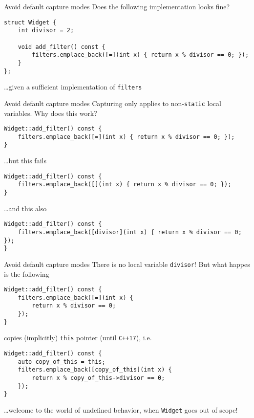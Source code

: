 \begin{frame}[fragile]{Avoid default capture modes}
    Does the following implementation looks fine?
    \begin{lstlisting}
struct Widget {
    int divisor = 2;

    void add_filter() const {
        filters.emplace_back([=](int x) { return x % divisor == 0; });
    }
};
    \end{lstlisting}
    \hfill \ldots given a sufficient implementation of \texttt{filters}

\end{frame}

\begin{frame}[fragile]{Avoid default capture modes}
    Capturing only applies to non-\texttt{static} local variables. Why does this work?
    \begin{lstlisting}
Widget::add_filter() const {
    filters.emplace_back([=](int x) { return x % divisor == 0; });
}
    \end{lstlisting}
    \ldots but this fails
    \begin{lstlisting}
Widget::add_filter() const {
    filters.emplace_back([](int x) { return x % divisor == 0; });
}
    \end{lstlisting}

    \ldots and this also
    \begin{lstlisting}
Widget::add_filter() const {
    filters.emplace_back([divisor](int x) { return x % divisor == 0; });
}
    \end{lstlisting}
\end{frame}

\begin{frame}[fragile]{Avoid default capture modes}
    There is no local variable \texttt{divisor}! But what happes is the following
    \begin{lstlisting}
Widget::add_filter() const {
    filters.emplace_back([=](int x) {
        return x % divisor == 0;
    });
}
    \end{lstlisting}
    copies (implicitly) \texttt{this} pointer (\textcolor{vertexDarkRed}{until \texttt{C++17}}), i.e.
    \begin{lstlisting}    
Widget::add_filter() const {
    auto copy_of_this = this;
    filters.emplace_back([copy_of_this](int x) {
        return x % copy_of_this->divisor == 0;
    });
}
    \end{lstlisting}

    \ldots welcome to the world of undefined behavior, when \texttt{Widget} goes out of scope!
\end{frame}

